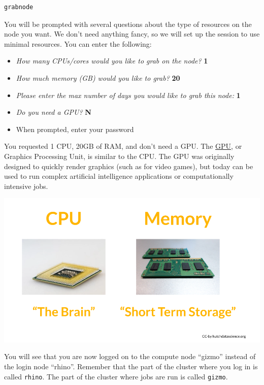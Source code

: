 \documentclass[
]{book}
\providecommand{\tightlist}{%
  \setlength{\itemsep}{0pt}\setlength{\parskip}{0pt}}
\begin{document}
\begin{verbatim}
grabnode
\end{verbatim}

You will be prompted with several questions about the type of resources on the node you want. We don't need anything fancy, so we will set up the session to use minimal resources. You can enter the following:

\begin{itemize}
\tightlist
\item
  \emph{How many CPUs/cores would you like to grab on the node?} \textbf{1}
\item
  \emph{How much memory (GB) would you like to grab?} \textbf{20}
\item
  \emph{Please enter the max number of days you would like to grab this node:} \textbf{1}
\item
  \emph{Do you need a GPU?} \textbf{N}
\item
  When prompted, enter your password
\end{itemize}

You requested 1 CPU, 20GB of RAM, and don't need a GPU. The \href{https://www.intel.com/content/www/us/en/products/docs/processors/what-is-a-gpu.html}{GPU}, or Graphics Processing Unit, is similar to the CPU. The GPU was originally designed to quickly render graphics (such as for video games), but today can be used to run complex artificial intelligence applications or computationally intensive jobs.

\begin{center}\includegraphics[width=0.8\linewidth]{resources/images/09-interactive_files/figure-latex//1BQxrVYdKZTbpCaF-i_q9w7s9x034lEXpQZDU-Sl09cs_gff2211b72f_1_26} \end{center}

You will see that you are now logged on to the compute node ``gizmo'' instead of the login node ``rhino''. Remember that the part of the cluster where you log in is called \texttt{rhino}. The part of the cluster where jobs are run is called \texttt{gizmo}.
\end{document}
